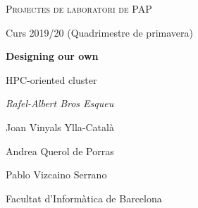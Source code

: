 \makeatletter
\begin{titlepage}
\thispagestyle{empty}
\begin{center}
	\centering
	\vspace{1cm}
	{\scshape\Large Projectes de laboratori de PAP\par}
	\vspace{0.5cm}
	{\Large Curs 2019/20 (Quadrimestre de primavera)\par}
	\vspace{3cm}
	{\huge\bfseries Designing our own\par HPC-oriented cluster\par}
	\vspace{6cm}
  {
  {\Large \itshape Rafel-Albert Bros Esqueu\par Joan Vinyals Ylla-Català\par Andrea Querol de Porras\par Pablo Vizcaino Serrano\par}
  }
  \vspace{0.5cm}
  \vfill
	{\large Facultat d'Informàtica de Barcelona\par}
\end{center}
\clearpage
\end{titlepage}